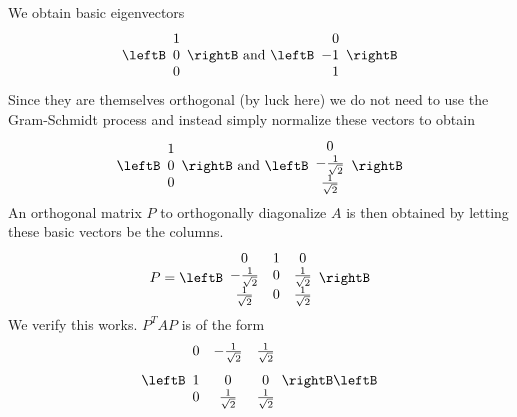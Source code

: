 \begin{solution}
We obtain basic eigenvectors 
\begin{equation*}
\leftB
\begin{array}{r}
1 \\ 
0 \\ 
0
\end{array}
\rightB \text{ and }\leftB 
\begin{array}{r}
0 \\ 
-1 \\ 
1
\end{array}
\rightB 
\end{equation*}
Since they are themselves orthogonal (by luck here) we do not need to
use the Gram-Schmidt process and instead simply normalize these
vectors to obtain 
\begin{equation*}
\leftB 
\begin{array}{r}
1 \\ 
0 \\ 
0
\end{array}
\rightB \text{ and }\leftB 
\begin{array}{c}
0 \\ 
-\frac{1}{\sqrt{2}} \\ 
\frac{1}{\sqrt{2}}
\end{array}
\rightB 
\end{equation*}
An orthogonal matrix $P$ to orthogonally diagonalize $A$  is then obtained by letting
these basic vectors be the columns. 
\begin{equation*}
P= \leftB 
\begin{array}{ccc}
0 & 1 & 0 \\ 
-\frac{1}{\sqrt{2}} & 0 & \frac{1}{\sqrt{2}} \\ 
\frac{1}{\sqrt{2}} & 0 & \frac{1}{\sqrt{2}}
\end{array}
\rightB 
\end{equation*}
We verify this works. $P^{T}AP$ is of the form 
\begin{equation*}
\leftB
\begin{array}{ccc}
0 & -\vspace{0.05in}\frac{1}{\sqrt{2}} & \vspace{0.05in}\frac{1}{\sqrt{2}}
\\ 
1 & 0 & 0 \\ 
0 & \vspace{0.05in}\frac{1}{\sqrt{2}} & \vspace{0.05in}\frac{1}{\sqrt{2}}
\end{array}
\rightB \leftB 
\begin{array}{ccc}

\end{array}
\end{equation*}
\end{solution}
